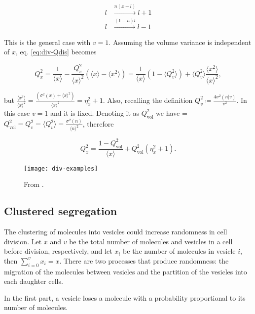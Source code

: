 \begin{equation}
  \begin{split}
    l&\xrightarrow{n(x-l)}l+1\\
    l&\xrightarrow{(1-n)l}l-1
  \end{split}
\end{equation}

This is the general case with $v=1$. Assuming the volume variance is independent of $x$, eq. \eqref{eq:div-Qdis} becomes

\begin{equation}
  Q_x^2 = \frac{1}{\langle x\rangle} - \frac{Q_v^2}{\langle x\rangle^2}\left(\langle x\rangle  - \langle x^2\rangle\right) = \frac{1}{\langle x\rangle}\left(1-\langle Q_v^2\rangle\right) + \langle Q_v^2\rangle\frac{\langle x^2\rangle}{\langle x\rangle^2},
\end{equation}

but $\frac{\langle x^2\rangle}{\langle x\rangle^2} = \frac{(\sigma^2(x) + \langle x\rangle^2)}{\langle x\rangle^2} = \eta_x^2 + 1$. Also, recalling the definition  $Q_v^2 \coloneqq \frac{4\sigma^2(n|v)}{v^2}$. In this case $v=1$ and it is fixed. Denoting it as $Q^2_\text{vol}$ we have = $Q^2_\text{vol} = Q_v^2 = \langle Q_v^2\rangle = \frac{\sigma^2(n)}{\langle n\rangle^2}$, therefore

\begin{equation}
  \boxed{Q_x^2 = \frac{1-Q_\text{vol}^2}{\langle x\rangle} + Q_\text{vol}^2(\eta^2_x+1)}.
\end{equation}

\begin{figure}[H]
  \centering
  \texttt{[image: div-examples]}
  \caption[FILL]{\label{fig:div-examples} From \cite{pedraza08}.}
\end{figure}

\subsection{Clustered segregation}

The clustering of molecules into vesicles could increase randomness in cell division. Let $x$ and $v$ be the total number of molecules and vesicles in a cell before division, respectively, and let $x_i$ be the number of molecules in vesicle $i$, then $\sum_{i=0}^vx_i=x$. There are two processes that produce randomness: the migration of the molecules between vesicles and the partition of the vesicles into each daughter cells.

In the first part, a vesicle loses a molecule with a probability proportional to its number of molecules.

